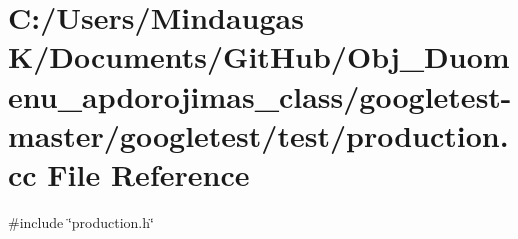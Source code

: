 \hypertarget{googletest-master_2googletest_2test_2production_8cc}{}\section{C\+:/\+Users/\+Mindaugas K/\+Documents/\+Git\+Hub/\+Obj\+\_\+\+Duomenu\+\_\+apdorojimas\+\_\+class/googletest-\/master/googletest/test/production.cc File Reference}
\label{googletest-master_2googletest_2test_2production_8cc}
{\ttfamily \#include \char`\"{}production.\+h\char`\"{}}\newline
